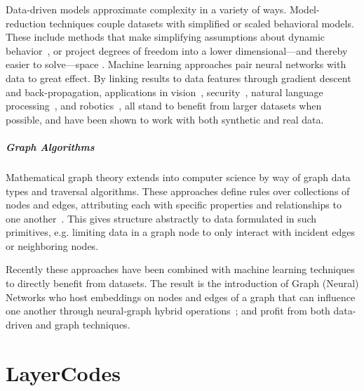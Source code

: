 \documentclass[12pt]{report}
\begin{document}
Data-driven models approximate complexity in a variety of ways.
Model-reduction techniques couple datasets with simplified or scaled behavioral models.
These include methods that make simplifying assumptions about dynamic 
behavior~\cite{Fei2018wetcloth,Fei2017wetHair}, 
or project degrees of freedom into a lower dimensional---and thereby easier to solve---space
\cite{goldfeder2011data,xu2015modelreduc}.
Machine learning approaches pair neural networks with data to great effect.
By linking results to data features through gradient descent and back-propagation,
applications in
vision~\cite{he2016vision},
security~\cite{xu2017security},
natural language processing~\cite{teufl2010nlp}, 
and robotics~\cite{kober2013robotics},
all stand to benefit from larger datasets when possible, 
and have been shown to work with both synthetic and real data.

\vspace{-2mm}
\paragraph{Graph Algorithms}\label{sec:rel_graph}
Mathematical graph theory extends into computer science by way of graph data types
and traversal algorithms.
These approaches define rules over collections of nodes and edges, attributing each with 
specific properties and relationships to one 
another~\cite{harris2009combinatorics, papadimitriou1998combinatorial}.
This gives structure abstractly to data formulated in such primitives, 
e.g. limiting data in a graph node to only interact with incident edges or neighboring nodes.

Recently these approaches have been combined with machine learning techniques to
directly benefit from datasets. 
The result is the introduction of Graph (Neural) Networks who host embeddings
on nodes and edges of a graph that can influence one another
through neural-graph hybrid 
operations~\cite{battaglia2018graphnetssummary,pfaff2021learning,sanchezgonzalez2020learning};
and profit from both data-driven and graph techniques. 

\chapter{LayerCodes}\label{layercodes}
\end{document}
